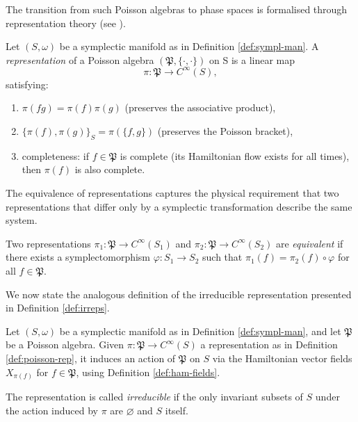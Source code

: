 The transition from such Poisson algebras to phase spaces is formalised through representation theory (see \cite[Definition 2.6.1]{landsmanMathematicalTopicsClassical1998}).

\begin{definition}\label{def:poisson-rep}
	Let  \((S,\omega)\) be a symplectic manifold as in Definition \ref{def:sympl-man}. A \emph{representation} of a Poisson algebra \((\mathfrak{P}, \{\cdot,\cdot\})\) on S is a linear map 
	\[
	\pi: \mathfrak{P} \to C^\infty(S),
	\]
	satisfying:
	\begin{enumerate}
		\item \(\pi(fg) = \pi(f)\pi(g)\) (preserves the associative product),
		\item \(\{\pi(f), \pi(g)\}_S = \pi(\{f,g\})\) (preserves the Poisson bracket),
		\item completeness: if \(f \in \mathfrak{P}\) is complete (its Hamiltonian flow exists for all times), then \(\pi(f)\) is also complete.
	\end{enumerate}
\end{definition}

\noindent The equivalence of representations captures the physical requirement that two representations that differ only by a symplectic transformation describe the same system.

\begin{definition}\label{def:poi-rep-equiv}
	Two representations \(\pi_1: \mathfrak{P} \to C^\infty(S_1)\) and \(\pi_2: \mathfrak{P} \to C^\infty(S_2)\) are \emph{equivalent} if there exists a symplectomorphism \(\varphi: S_1 \to S_2\) such that \(\pi_1(f) = \pi_2(f) \circ \varphi\) for all \(f \in \mathfrak{P}\).
\end{definition}

\noindent We now state the analogous definition of the irreducible representation presented in Definition \ref{def:irreps}.

\begin{definition}\label{def:poisson-irrep}
	Let \((S,\omega)\) be a symplectic manifold as in Definition \ref{def:sympl-man}, and let $\mathfrak{P}$ be a Poisson algebra.  Given $\pi: \mathfrak{P} \to C^\infty(S)$ a representation as in Definition \ref{def:poisson-rep}, it induces an action of \(\mathfrak{P}\) on \(S\) via the Hamiltonian vector fields \(X_{\pi(f)}\) for \(f \in \mathfrak{P}\), using Definition \ref{def:ham-fields}.  
	
	The representation is called \emph{irreducible} if the only invariant subsets of \(S\) under the action induced by $\pi$ are \(\varnothing\) and \(S\) itself. 
\end{definition}

